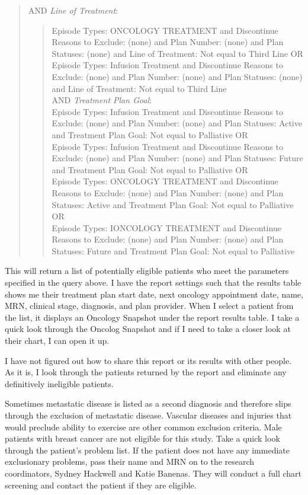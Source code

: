 \documentclass[
]{book}
\begin{document}
\begin{quote}
AND \emph{Line of Treatment}:\\

\begin{quote}
Episode Types: ONCOLOGY TREATMENT and Discontinue Reasons to Exclude: (none) and Plan Number: (none) and Plan Statuses: (none) and Line of Treatment: Not equal to Third Line OR\\
Episode Types: Infusion Treatment and Discontinue Reasons to Exclude: (none) and Plan Number: (none) and Plan Statuses: (none) and Line of Treatment: Not equal to Third Line\\
AND \emph{Treatment Plan Goal}:\\
Episode Types: Infusion Treatment and Discontinue Reasons to Exclude: (none) and Plan Number: (none) and Plan Statuses: Active and Treatment Plan Goal: Not equal to Palliative OR\\
Episode Types: Infusion Treatment and Discontinue Reasons to Exclude: (none) and Plan Number: (none) and Plan Statuses: Future and Treatment Plan Goal: Not equal to Palliative OR\\
Episode Types: ONCOLOGY TREATMENT and Discontinue Reasons to Exclude: (none) and Plan Number: (none) and Plan Statuses: Active and Treatment Plan Goal: Not equal to Palliative OR\\
Episode Types: IONCOLOGY TREATMENT and Discontinue Reasons to Exclude: (none) and Plan Number: (none) and Plan Statuses: Future and Treatment Plan Goal: Not equal to Palliative
\end{quote}
\end{quote}

This will return a list of potentially eligible patients who meet the parameters specified in the query above. I have the report settings such that the results table shows me their treatment plan start date, next oncology appointment date, name, MRN, clinical stage, diagnosis, and plan provider. When I select a patient from the list, it displays an Oncology Snapshot under the report results table. I take a quick look through the Oncolog Snapshot and if I need to take a closer look at their chart, I can open it up.

I have not figured out how to share this report or its results with other people. As it is, I look through the patients returned by the report and eliminate any definitively ineligible patients.

Sometimes metastatic disease is listed as a second diagnosis and therefore slips through the exclusion of metastatic disease. Vascular diseases and injuries that would preclude ability to exercise are other common exclusion criteria. Male patients with breast cancer are not eligible for this study. Take a quick look through the patient's problem list. If the patient does not have any immediate exclusionary problems, pass their name and MRN on to the research coordinators, Sydney Hackwell and Katie Banenas. They will conduct a full chart screening and contact the patient if they are eligible.
\end{document}
